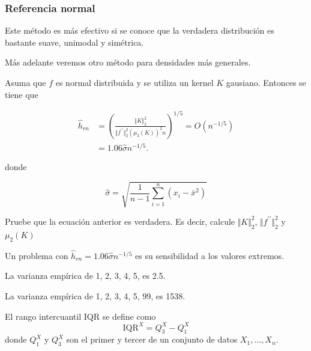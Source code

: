 \documentclass[12pt]{book}\usepackage[]{graphicx}\usepackage[]{color}
\theoremstyle{definition}
\theoremstyle{plain}
\begin{document}
\newpage

\subsubsection{Referencia normal}

\begin{cuidado}{}{}
	Este método es más efectivo si se conoce que la verdadera distribución es bastante suave, unimodal y simétrica.

	Más adelante veremos otro método para densidades más generales.
\end{cuidado}

Asuma que \(f\) es normal distribuida y se utiliza un kernel \(K\) gausiano. Entonces se tiene que

\begin{align*}
	\hat{h}_{rn} & =\left(\frac{\Vert K\Vert_{2}^{2}}{\Vert f^{\prime\prime}\Vert_{2}^{2}\left(\mu_{2}(K)\right)^{2}n}\right)^{1/5}=O\left( n^{-1/5} \right) \\
	             & =1.06 \hat{\sigma} n^{-1/5}.
\end{align*}

donde

\begin{equation*}
	\hat{\sigma} = \sqrt{\frac{1}{n-1} \sum_{i=1}^{n} \left( x_{i}-\bar{x}^{2} \right)}
\end{equation*}

\begin{tarea}{}{}
	Pruebe que la ecuación anterior es verdadera. Es decir, calcule \(\Vert K\Vert_{2}^{2}\), \(\Vert f^{\prime\prime}\Vert_{2}^{2}\) y \(\mu_{2}(K)\)
\end{tarea}

\begin{nota}{}{}
	Un problema con \(\hat{h}_{rn}=1.06 \hat{\sigma} n^{-1/5}\) es su sensibilidad a los valores extremos.
\end{nota}

\begin{ejemplo}{}{}
	La varianza empírica de  1, 2, 3, 4, 5, es  2.5.

	La varianza empírica de 1, 2, 3, 4, 5, 99, es 1538.
\end{ejemplo}

El rango intercuantil IQR se define como
\begin{equation*}
	\mathrm{IQR}^{X} = Q^{X}_{3} - Q^{X}_{1}
\end{equation*}
donde \(Q^{X}_{1}\) y \(Q^{X}_{3}\) son el primer y tercer  de un conjunto de datos \(X_{1},\ldots, X_n\).
\end{document}
